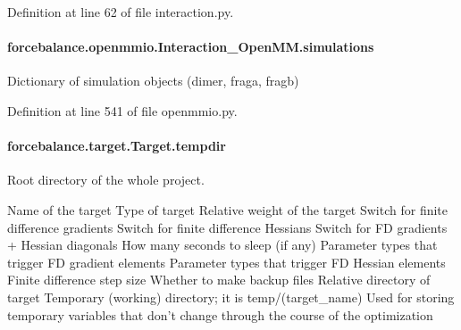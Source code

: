Definition at line 62 of file interaction.\-py.

\hypertarget{classforcebalance_1_1openmmio_1_1Interaction__OpenMM_a914baf305ebbafd362e9b2ddfb69f7e7}{
\paragraph[{simulations}]{\setlength{\rightskip}{0pt plus 5cm}forcebalance.\-openmmio.\-Interaction\-\_\-\-Open\-M\-M.\-simulations}}\label{classforcebalance_1_1openmmio_1_1Interaction__OpenMM_a914baf305ebbafd362e9b2ddfb69f7e7}


Dictionary of simulation objects (dimer, fraga, fragb) 



Definition at line 541 of file openmmio.\-py.

\hypertarget{classforcebalance_1_1target_1_1Target_aa1f01b5b78db253b5b66384ed11ed193}{
\paragraph[{tempdir}]{\setlength{\rightskip}{0pt plus 5cm}forcebalance.\-target.\-Target.\-tempdir\hspace{0.3cm}{\ttfamily [inherited]}}}\label{classforcebalance_1_1target_1_1Target_aa1f01b5b78db253b5b66384ed11ed193}


Root directory of the whole project. 

Name of the target Type of target Relative weight of the target Switch for finite difference gradients Switch for finite difference Hessians Switch for F\-D gradients + Hessian diagonals How many seconds to sleep (if any) Parameter types that trigger F\-D gradient elements Parameter types that trigger F\-D Hessian elements Finite difference step size Whether to make backup files Relative directory of target Temporary (working) directory; it is temp/(target\-\_\-name) Used for storing temporary variables that don't change through the course of the optimization 

